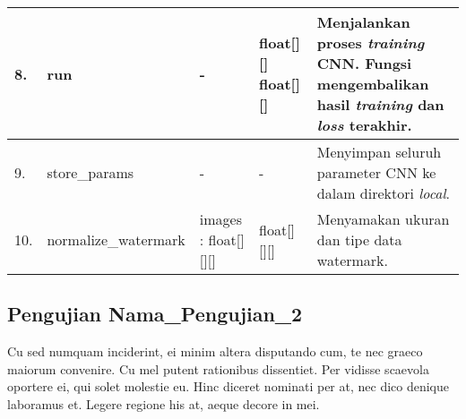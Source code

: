 \begin{small}
\begin{longtable}[c]{|p{0.4cm}|p{3cm}|p{2.8cm}|p{1.8cm}|p{3.8cm}|}
		8. & run & - & float[][] \newline float[][] & Menjalankan proses \textit{training} CNN. Fungsi mengembalikan hasil \textit{training} dan \textit{loss} terakhir. \\ \hline
		9. & store\_params & - & - & Menyimpan seluruh parameter CNN ke dalam direktori \textit{local}. \\ \hline
		10. & normalize\newline \_watermark & images : float[][][] & float[][][] & Menyamakan ukuran dan tipe data watermark. \\ \hline
		
	\end{longtable}
\end{small}

\subsection{Pengujian Nama\_Pengujian\_2}
Cu sed numquam inciderint, ei minim altera disputando cum, te nec graeco maiorum convenire.
Cu mel putent rationibus dissentiet. Per vidisse scaevola oportere ei, qui solet molestie eu. Hinc diceret nominati per at, nec dico denique laboramus et. Legere regione his at, aeque decore in mei.\\